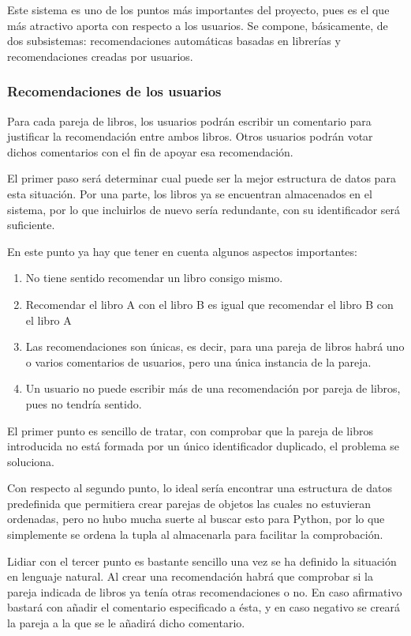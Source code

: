 Este sistema es uno de los puntos más importantes del proyecto, pues es el que más atractivo aporta con respecto a los usuarios. Se compone, básicamente, de dos subsistemas: recomendaciones automáticas basadas en librerías y recomendaciones creadas por usuarios.

\subsubsection{Recomendaciones de los usuarios}

Para cada pareja de libros, los usuarios podrán escribir un comentario para justificar la recomendación entre ambos libros. Otros usuarios podrán votar dichos comentarios con el fin de apoyar esa recomendación.

El primer paso será determinar cual puede ser la mejor estructura de datos para esta situación. Por una parte, los libros ya se encuentran almacenados en el sistema, por lo que incluirlos de nuevo sería redundante, con su identificador será suficiente.

En este punto ya hay que tener en cuenta algunos aspectos importantes:

\begin{enumerate}
    \item No tiene sentido recomendar un libro consigo mismo.
    \item Recomendar el libro A con el libro B es igual que recomendar el libro B con el libro A
    \item Las recomendaciones son únicas, es decir, para una pareja de libros habrá uno o varios comentarios de usuarios, pero una única instancia de la pareja.
    \item Un usuario no puede escribir más de una recomendación por pareja de libros, pues no tendría sentido.
\end{enumerate}

El primer punto es sencillo de tratar, con comprobar que la pareja de libros introducida no está formada por un único identificador duplicado, el problema se soluciona.

Con respecto al segundo punto, lo ideal sería encontrar una estructura de datos predefinida que permitiera crear parejas de objetos las cuales no estuvieran ordenadas, pero no hubo mucha suerte al buscar esto para Python, por lo que simplemente se ordena la tupla al almacenarla para facilitar la comprobación.

Lidiar con el tercer punto es bastante sencillo una vez se ha definido la situación en lenguaje natural. Al crear una recomendación habrá que comprobar si la pareja indicada de libros ya tenía otras recomendaciones o no. En caso afirmativo bastará con añadir el comentario especificado a ésta, y en caso negativo se creará la pareja a la que se le añadirá dicho comentario.


